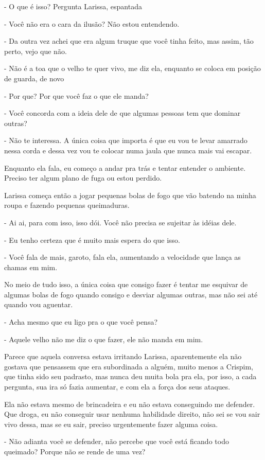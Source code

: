 - O que é isso? Pergunta Larissa, espantada 

- Você não era o cara da ilusão? Não estou entendendo.

- Da outra vez achei que era algum truque que você tinha feito, mas assim, tão perto, vejo que não.

- Não é a toa que o velho te quer vivo, me diz ela, enquanto se coloca em posição de guarda, de novo

- Por que? Por que você faz o que ele manda?

- Você concorda com a ideia dele de que algumas pessoas tem que dominar outras?

- Não te interessa. A única coisa que importa é que eu vou te levar amarrado nessa corda e dessa vez vou te colocar numa jaula que nunca mais vai escapar.

Enquanto ela fala, eu começo a andar pra trás e tentar entender o ambiente. Preciso ter algum plano de fuga ou estou perdido.

Larissa começa então a jogar pequenas bolas de fogo que vão batendo na minha roupa e fazendo pequenas queimaduras.

- Ai ai, para com isso, isso dói. Você não precisa se sujeitar às idéias dele.

- Eu tenho certeza que é muito mais espera do que isso.

- Você fala de mais, garoto, fala ela, aumentando a velocidade  que lança as chamas em mim.

No meio de tudo isso, a única coisa que consigo fazer é tentar me esquivar de algumas bolas de fogo quando consigo e desviar algumas outras, mas não sei até quando vou aguentar.

- Acha mesmo que eu ligo pra o que você pensa?

- Aquele velho não me diz o que fazer, ele não manda em mim.

Parece que aquela conversa estava irritando Larissa, aparentemente ela não gostava que pensassem que era subordinada a alguém, muito menos a Crispim, que tinha sido seu padrasto, mas nunca deu muita bola pra ela, por isso, a cada pergunta, sua ira só fazia aumentar, e com ela a força dos seus ataques.

Ela não estava mesmo de brincadeira e eu não estava conseguindo me defender. Que droga, eu não conseguir usar nenhuma habilidade direito, não sei se vou sair vivo dessa, mas se eu sair, preciso urgentemente fazer alguma coisa.

- Não adianta você se defender, não percebe que você está ficando todo queimado? Porque não se rende de uma vez?

